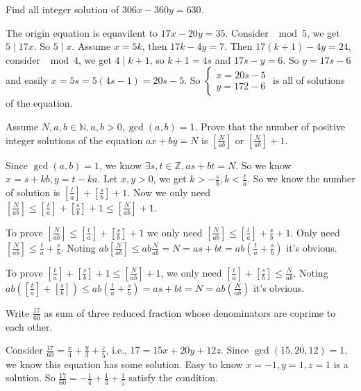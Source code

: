 \documentclass{ctexart}
\begin{document}
\begin{problem}\label{pro:p23.1.b}
  Find all integer solution of \(306x-360y=630\).
\end{problem}
\begin{solution}
  The origin equation is equavilent to \(17x-20y=35\).
  Consider \(\mod 5\), we get \(5 \mid 17 x\). So \(5 \mid x\).
  Assume \(x=5k\), then \(17k-4y=7\).
  Then \(17(k+1)-4y=24\), consider \(\mod 4\), we get \(4 \mid k+1\), so \(k+1=4s\) and \(17s-y=6\).
  So \(y=17s-6\) and easily \(x=5s=5(4s-1)=20s-5\).
  So \(\begin{cases}
    x=20s-5 \\
    y=172-6
  \end{cases}\) is all of solutions of the equation.
\end{solution}
\begin{problem}\label{pro:p23.3}
  Assume \(N,a,b \in \mathbb{N},a,b>0,\gcd(a,b)=1\).
  Prove that the number of positive integer solutions of the equation \(ax+by=N\)
  is \(\left[\frac{N}{ab}\right]\) or \(\left[\frac{N}{ab}\right]+1\).
\end{problem}

\begin{solution}
  Since \(\gcd(a,b)=1\), we know \(\exists s,t \in \mathbb{Z},as+bt=N\).
  So we know \(x=s+kb,y=t-ka\). Let \(x,y>0\), we get \(k> -\frac{s}{b},k<\frac{t}{a}\).
  So we know the number of solution is \(\left[\frac{t}{a}\right]+\left[\frac{s}{b}\right]+1\).
  Now we only need \(\left[\frac{N}{ab}\right]\leq\left[\frac{t}{a}\right]+\left[\frac{s}{b}\right]+1 \leq \left[\frac{N}{ab}\right]+1\).

  To prove \(\left[\frac{N}{ab}\right]\leq\left[\frac{t}{a}\right]+\left[\frac{s}{b}\right]+1\) we only need
  \(\left[\frac{N}{ab}\right]\leq\left[\frac{t}{a}\right]+\frac{s}{b}+1\).
  Only need \(\left[\frac{N}{ab}\right]\leq\frac{t}{a}+\frac{s}{b}\).
  Noting \(ab \left[\frac{N}{ab}\right] \leq ab \frac{N}{ab}=N=as+bt=ab(\frac{t}{a}+\frac{s}{b})\) it's obvious.

  To prove \(\left[\frac{t}{a}\right]+\left[\frac{s}{b}\right]+1 \leq \left[\frac{N}{ab}\right]+1\),
  we only need \(\left[\frac{t}{a}\right]+\left[\frac{s}{b}\right] \leq \frac{N}{ab}\).
  Noting \(ab(\left[\frac{t}{a}\right]+\left[\frac{s}{b}\right]) \leq ab(\frac{t}{a}+\frac{s}{b})=as+bt=N=ab(\frac{N}{ab})\) it's obvious.
\end{solution}
\begin{problem}\label{pro:p24.2}
  Write \(\frac{17}{60}\) as sum of three reduced fraction whose denominators are coprime to each other.
\end{problem}
\begin{solution}
  Consider \(\frac{17}{60}=\frac{x}{4}+\frac{y}{3}+\frac{z}{5}\), i.e., \(17=15x+20y+12z\).
  Since \(\gcd(15,20,12)=1\), we know this equation has some solution.
  Easy to know \(x=-1,y=1,z=1\) is a solution.
  So \(\frac{17}{60}=-\frac{1}{4}+\frac{1}{3}+\frac{1}{5}\) satisfy the condition.
\end{solution}
\end{document}
